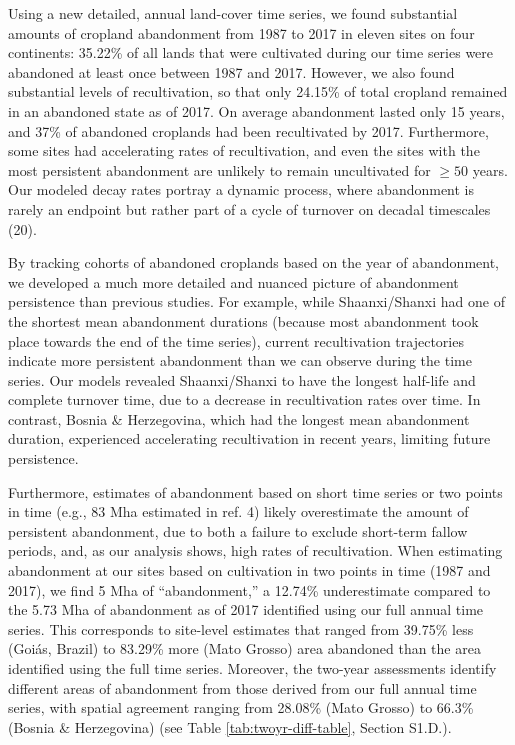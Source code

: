 \documentclass[9pt,twocolumn,twoside,lineno]{pnas-new}
\begin{document}
Using a new detailed, annual land-cover time series, we found substantial amounts of cropland abandonment from 1987 to 2017 in eleven sites on four continents: 35.22\% of all lands that were cultivated during our time series were abandoned at least once between 1987 and 2017.
However, we also found substantial levels of recultivation, so that only 24.15\% of total cropland remained in an abandoned state as of 2017.
On average abandonment lasted only 15 years, and 37\% of abandoned croplands had been recultivated by 2017.
Furthermore, some sites had accelerating rates of recultivation, and even the sites with the most persistent abandonment are unlikely to remain uncultivated for \(\geq50\) years.
Our modeled decay rates portray a dynamic process, where abandonment is rarely an endpoint but rather part of a cycle of turnover on decadal timescales (20).

By tracking cohorts of abandoned croplands based on the year of abandonment, we developed a much more detailed and nuanced picture of abandonment persistence than previous studies.
For example, while Shaanxi/Shanxi had one of the shortest mean abandonment durations (because most abandonment took place towards the end of the time series), current recultivation trajectories indicate more persistent abandonment than we can observe during the time series.
Our models revealed Shaanxi/Shanxi to have the longest half-life and complete turnover time, due to a decrease in recultivation rates over time.
In contrast, Bosnia \& Herzegovina, which had the longest mean abandonment duration, experienced accelerating recultivation in recent years, limiting future persistence.

Furthermore, estimates of abandonment based on short time series or two points in time (e.g., 83 Mha estimated in ref. 4) likely overestimate the amount of persistent abandonment, due to both a failure to exclude short-term fallow periods, and, as our analysis shows, high rates of recultivation.
When estimating abandonment at our sites based on cultivation in two points in time (1987 and 2017), we find 5 Mha of ``abandonment,'' a 12.74\% underestimate compared to the 5.73 Mha of abandonment as of 2017 identified using our full annual time series.
This corresponds to site-level estimates that ranged from 39.75\% less (Goiás, Brazil) to 83.29\% more (Mato Grosso) area abandoned than the area identified using the full time series.
Moreover, the two-year assessments identify different areas of abandonment from those derived from our full annual time series, with spatial agreement ranging from 28.08\% (Mato Grosso) to 66.3\% (Bosnia \& Herzegovina) (see Table \ref{tab:twoyr-diff-table}, Section S1.D.).
\end{document}
